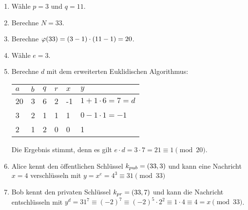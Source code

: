 \begin{example}\mbox{}
  \begin{enumerate}
    \item Wähle $p = 3$ und $q = 11$.
    \item Berechne $N = 33$.
    \item Berechne $\varphi(33) = (3 - 1) \cdot (11 - 1) = 20$.
    \item Wähle $e = 3$.
    \item Berechne $d$ mit dem erweiterten Euklidischen Algorithmus:
          \begin{center}
            \begin{tabular}{|l|l|l|l|l|l|}
              \hline
              $a$ & $b$ & $q$ & $r$ & $x$ & $y$                     \\ \hline
              20  & 3   & 6   & 2   & -1  & $1 + 1 \cdot 6 = 7 = d$ \\ \hline
              3   & 2   & 1   & 1   & 1   & $0 - 1 \cdot 1 = -1$    \\ \hline
              2   & 1   & 2   & 0   & 0   & 1                       \\ \hline
            \end{tabular}
          \end{center}
          Die Ergebnis stimmt, denn es gilt $e \cdot d = 3 \cdot 7 = 21 \equiv 1 \pmod{20}$.
    \item Alice kennt den öffentlichen Schlüssel $k_{pub} = (33,3)$ und kann eine
          Nachricht $x = 4$ verschlüsseln mit $y = x^e = 4^3 \equiv 31 \pmod{33}$
    \item Bob kennt den privaten Schlüssel $k_{pr} = (33,7)$ und kann die Nachricht
          entschlüsseln mit $y^d = 31^7 \equiv (-2)^7 \equiv (-2)^5 \cdot 2^2 \equiv
            1 \cdot 4 \equiv 4 = x \pmod{33}$.
  \end{enumerate}
\end{example}